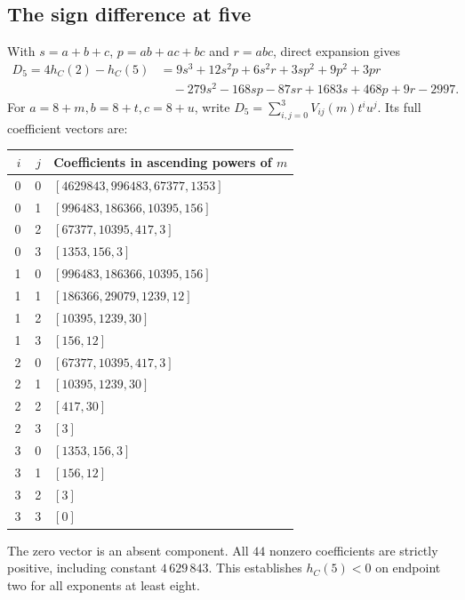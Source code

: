 \clearpage
\subsection{The sign difference at five}

With $s=a+b+c$, $p=ab+ac+bc$ and $r=abc$, direct expansion gives
\begin{align*}
D_5=4h_C(2)-h_C(5)
 &=9s^3+12s^2p+6s^2r+3sp^2+9p^2+3pr\\
 &\quad-279s^2-168sp-87sr+1683s+468p+9r-2997.
\end{align*}
For $a=8+m,b=8+t,c=8+u$, write
$D_5=\sum_{i,j=0}^3 V_{ij}(m)t^iu^j$. Its full coefficient vectors are:
\begin{center}
\footnotesize
\setlength{\tabcolsep}{4pt}
\begin{tabular}{rrp{0.86\linewidth}}
\toprule
$i$ & $j$ & Coefficients in ascending powers of $m$ \\
\midrule
0 & 0 & $[4629843,\allowbreak 996483,\allowbreak 67377,\allowbreak 1353]$ \\
0 & 1 & $[996483,\allowbreak 186366,\allowbreak 10395,\allowbreak 156]$ \\
0 & 2 & $[67377,\allowbreak 10395,\allowbreak 417,\allowbreak 3]$ \\
0 & 3 & $[1353,\allowbreak 156,\allowbreak 3]$ \\
1 & 0 & $[996483,\allowbreak 186366,\allowbreak 10395,\allowbreak 156]$ \\
1 & 1 & $[186366,\allowbreak 29079,\allowbreak 1239,\allowbreak 12]$ \\
1 & 2 & $[10395,\allowbreak 1239,\allowbreak 30]$ \\
1 & 3 & $[156,\allowbreak 12]$ \\
2 & 0 & $[67377,\allowbreak 10395,\allowbreak 417,\allowbreak 3]$ \\
2 & 1 & $[10395,\allowbreak 1239,\allowbreak 30]$ \\
2 & 2 & $[417,\allowbreak 30]$ \\
2 & 3 & $[3]$ \\
3 & 0 & $[1353,\allowbreak 156,\allowbreak 3]$ \\
3 & 1 & $[156,\allowbreak 12]$ \\
3 & 2 & $[3]$ \\
3 & 3 & $[0]$ \\
\bottomrule
\end{tabular}
\end{center}
The zero vector is an absent component. All $44$ nonzero coefficients
are strictly positive, including constant $4\,629\,843$. This establishes
$h_C(5)<0$ on endpoint two for all exponents at least eight.

